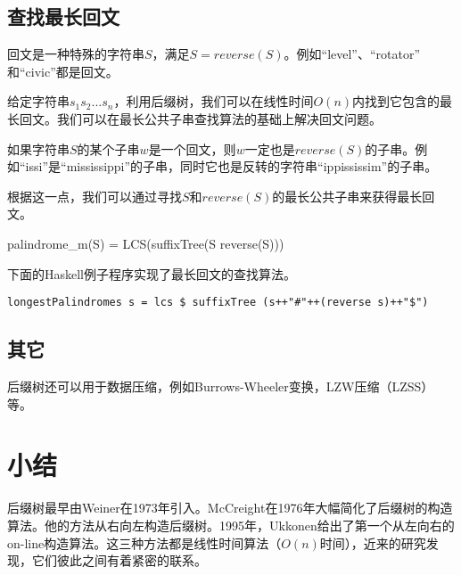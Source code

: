 \documentclass[UTF8]{article}
\begin{document}
\subsection{查找最长回文}

回文是一种特殊的字符串$S$，满足$S=reverse(S)$。例如“level”、“rotator”
和“civic”都是回文。

给定字符串$s_1s_2...s_n$，利用后缀树，我们可以在线性时间$O(n)$内找到它包含的最长回文。我们可以在最长公共子串查找算法的基础上解决回文问题。

如果字符串$S$的某个子串$w$是一个回文，则$w$一定也是$reverse(S)$的子串。例如“issi”是“mississippi”的子串，同时它也是反转的字符串“ippississim”的子串。

根据这一点，我们可以通过寻找$S$和$reverse(S)$的最长公共子串来获得最长回文。

\be
palindrome_m(S) = LCS(suffixTree(S \cup reverse(S)))
\ee

下面的Haskell例子程序实现了最长回文的查找算法。

\lstset{language=Haskell}
\begin{lstlisting}[style=Haskell]
longestPalindromes s = lcs $ suffixTree (s++"#"++(reverse s)++"$")
\end{lstlisting}

\subsection{其它}
后缀树还可以用于数据压缩，例如Burrows-Wheeler变换，LZW压缩（LZSS）等\cite{wiki-suffix-tree}。

\section{小结}

后缀树最早由Weiner在1973年引入\cite{weiner73}。McCreight在1976年大幅简化了后缀树的构造算法。他的方法从右向左构造后缀树。1995年，Ukkonen给出了第一个从左向右的on-line构造算法。这三种方法都是线性时间算法（$O(n)$时间），近来的研究发现，它们彼此之间有着紧密的联系\cite{GieKur97}。
\end{document}
